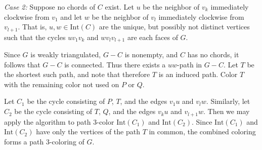 \documentclass[letterpaper, 12pt]{article}
\theoremstyle{thm}
\begin{document}
\textit{Case 2:} Suppose no chords of $C$ exist. Let $u$ be the neighbor of
$v_k$ immediately clockwise from $v_1$ and let $w$ be the neighbor of $v_l$
immediately clockwise from $v_{l+1}$. That is, $u,w\in\text{Int}(C)$ are the
unique, but possibly not distinct vertices such that the cycles $uv_1v_k$ and
$wv_lv_{l+1}$ are each faces of $G$.

Since $G$ is weakly triangulated, $G-C$ is nonempty, and $C$ has no chords, it
follows that $G-C$ is connected. Thus there exists a $uw$-path in
$G-C$. Let $T$ be the shortest such path, and note that therefore $T$ is
an induced path. Color $T$ with the remaining color not used on $P$ or $Q$.

Let $C_1$ be the cycle
consisting of $P$, $T$, and the edges $v_1u$ and $v_lw$. Similarly, let $C_2$ be
the cycle consisting of $T$, $Q$, and the edges $v_ku$ and $v_{l+1}w$. Then we
may apply the algorithm to path $3$-color $\text{Int}(C_1)$ and
$\text{Int}(C_2)$. Since $\text{Int}(C_1)$ and $\text{Int}(C_2)$ have only the
vertices of the path $T$ in common, the combined coloring forms a path
$3$-coloring of $G$.\\
\end{document}
